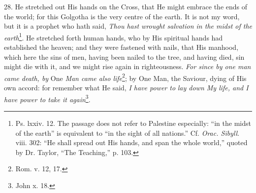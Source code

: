 28. He stretched out His hands on the Cross, that He might embrace the ends of the world; for this Golgotha is the very centre of the earth. It is not my word, but it is a prophet who hath said, \emph{Thou hast wrought salvation in the midst of the earth}\footnote{Ps. lxxiv. 12. The passage does not refer to Palestine especially: “in the midst of the earth” is equivalent to “in the sight of all nations.” Cf. \emph{Orac. Sibyll}. viii. 302: “He shall spread out His hands, and span the whole world,” quoted by Dr. Taylor, “The Teaching,” p. 103.}. He stretched forth human hands, who by His spiritual hands had established the heaven; and they were fastened with nails, that His manhood, which here the sins of men, having been nailed to the tree, and having died, sin might die with it, and we might rise again in righteousness. \emph{For since by one man came death, by} One \emph{Man came also life}\footnote{Rom. v. 12, 17.}; by One Man, the Saviour, dying of His own accord: for remember what He said, \emph{I have power to} \emph{lay down My life, and I have power to take it again}\footnote{John x. 18.}.

